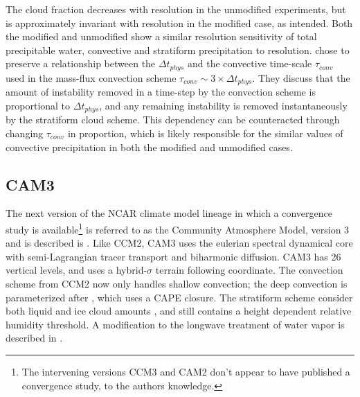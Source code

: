 The cloud fraction decreases with resolution in the unmodified experiments, but is approximately invariant with resolution in the modified case, as intended. Both the modified and unmodified show a similar resolution sensitivity of total precipitable water, convective and stratiform precipitation to resolution. \cite{WETAL1995CD} chose to preserve a relationship between the $\Delta t_{phys}$ and the convective time-scale $\tau_{conv}$ used in the mass-flux convection scheme $\tau_{conv} \sim 3 \times \Delta t_{phys}$. They discuss that the amount of instability removed in a time-step by the convection scheme is proportional to $\Delta t_{phys}$, and any remaining instability is removed instantaneously by the stratiform cloud scheme. This dependency can be counteracted through changing $\tau_{conv}$ in proportion, which is likely responsible for the similar values of convective precipitation in both the modified and unmodified cases.

\subsection{CAM3}

The next version of the NCAR climate model lineage in which a convergence study is available\footnote{The intervening versions CCM3 and CAM2 don't appear to have published a convergence study, to the authors knowledge.} is referred to as the Community Atmosphere Model, version 3 and is described is \cite{CAM3}. Like CCM2, CAM3 uses the eulerian spectral dynamical core with semi-Lagrangian tracer transport and biharmonic diffusion. CAM3 has 26 vertical levels, and uses a hybrid-$\sigma$ terrain following coordinate. The \cite{H1994JGR} convection scheme from CCM2 now only handles shallow convection; the deep convection is parameterized after \cite{ZM1995AO}, which uses a CAPE closure. The stratiform scheme consider both liquid and ice cloud amounts \citep{RK1998JCLIM,ZETAL2003JGR}, and still contains a height dependent relative humidity threshold. A modification to the longwave treatment of water vapor is described in \cite{CETAL2002JGR}.

